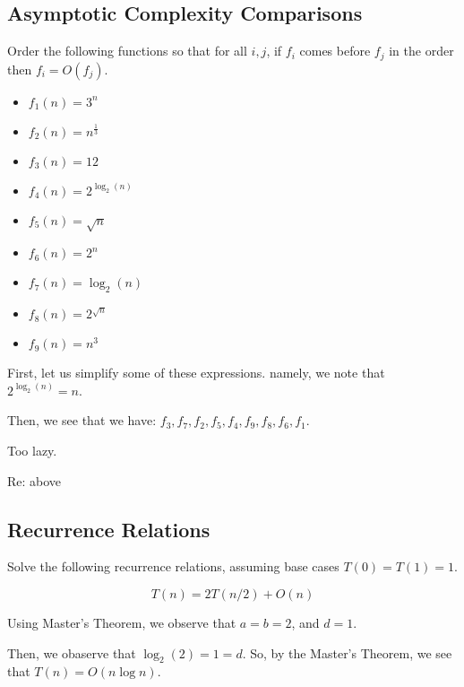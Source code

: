 \documentclass[openany]{book}
\begin{document}
\subsection{Asymptotic Complexity Comparisons}
\begin{hw}
	Order the following functions so that for all $i, j$, if $f_i$ comes before $f_j$ in the order then $f_i = O(f_j)$.
	\begin{itemize}
		\item $f_1(n) = 3^{n}$
		\item $f_2(n) = n^{\frac{1}{3}}$
		\item $f_3(n) = 12$
		\item $f_4(n) = 2^{\log_2(n)}$
		\item $f_5(n) = \sqrt{n}$
		\item $f_6(n) = 2^{n}$
		\item $f_7(n) = \log_2(n)$
		\item $f_8(n) = 2^{\sqrt{n}}$
		\item $f_9(n) = n^{3}$
	\end{itemize}
\end{hw}
\begin{solution}
	First, let us simplify some of these expressions. namely, we note that $2^{\log_2(n)} = n$.
	
	Then, we see that we have: $f_3, f_7, f_2, f_5, f_4, f_9, f_8, f_6, f_1$.
\end{solution}

\begin{hw}
	Too lazy.
\end{hw}
\begin{solution}
	Re: above
\end{solution}

\subsection{Recurrence Relations}
Solve the following recurrence relations, assuming base cases $T(0) = T(1) = 1$.
\begin{hw}
	\begin{equation*}
		T(n) = 2 T(n/2) + O(n)
	\end{equation*}
\end{hw}
\begin{solution}
	Using Master's Theorem, we observe that $a = b = 2$, and $d = 1$.
	
	Then, we obaserve that $\log_2(2) = 1 = d$. So, by the Master's Theorem, we see that $T(n) = O(n\log n)$. 
\end{solution}
\end{document}
